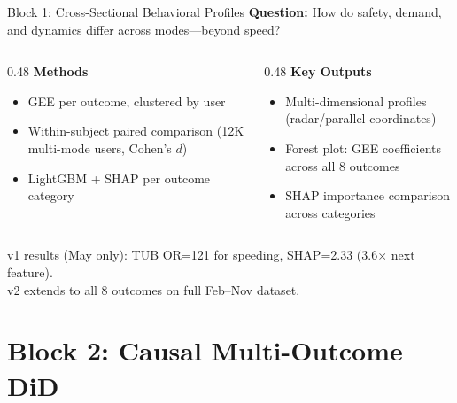 \documentclass[aspectratio=169, 11pt]{beamer}
\begin{document}
\begin{frame}{Block 1: Cross-Sectional Behavioral Profiles}
\textbf{\color{UMNMaroon}Question:} How do safety, demand, and dynamics differ across modes---beyond speed?

\vspace{0.3cm}
\begin{columns}[T]
\begin{column}{0.48\textwidth}
\textbf{Methods}
\begin{itemize}
\item GEE per outcome, clustered by user
\item Within-subject paired comparison (12K multi-mode users, Cohen's $d$)
\item LightGBM + SHAP per outcome category
\end{itemize}
\end{column}
\begin{column}{0.48\textwidth}
\textbf{Key Outputs}
\begin{itemize}
\item Multi-dimensional profiles (radar/parallel coordinates)
\item Forest plot: GEE coefficients across all 8 outcomes
\item SHAP importance comparison across categories
\end{itemize}
\end{column}
\end{columns}

\vspace{0.3cm}
\begin{center}
\footnotesize\color{gray}
v1 results (May only): TUB OR=121 for speeding, SHAP=2.33 (3.6$\times$ next feature).\\
v2 extends to all 8 outcomes on full Feb--Nov dataset.
\end{center}
\end{frame}

\section{Block 2: Causal Multi-Outcome DiD}
\end{document}
